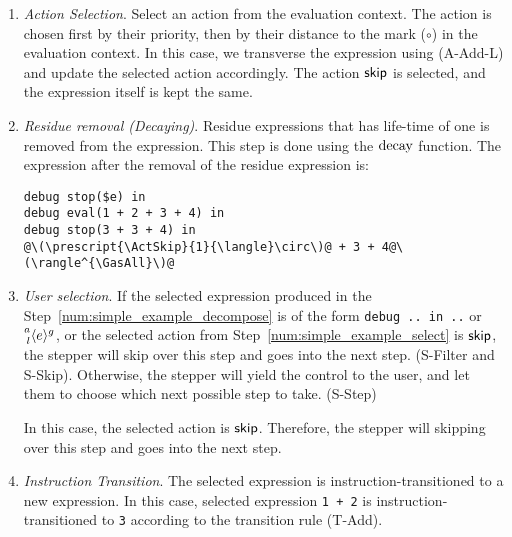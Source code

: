 \begin{enumerate}
  \begin{lstlisting}[language=hazel,caption={Decomposed evaluation context},label={lst:simple_example_decompose}]
debug stop($e) in
debug eval(1 + 2 + 3 + 4) in
debug stop(3 + 3 + 4) in
@\(
\prescript{\ActSkip}{1}{\langle}
\prescript{\ActStep}{0}{\langle}
\prescript{\ActStep}{0}{\langle}
\circ{\rangle}^{\GasOne}\)@ + 3@\({\rangle}^{\GasOne}\)@ + 4@\(
\rangle^{\GasAll}
\)@\end{lstlisting}

\item \emph{Action Selection}. \label{num:simple_example_select}
  Select an action from the evaluation context. The action is chosen
  first by their priority, then by their distance to the mark
  (\(\circ\)) in the evaluation context. In this case, we transverse
  the expression using (A-Add-L) and update the selected action
  accordingly. The action \(\ActSkip\) is selected, and the expression
  itself is kept the same.

\item \emph{Residue removal (Decaying)}. Residue expressions that
  has life-time of one is removed from the expression. This step is
  done using the \(\Decay\) function. The expression after the removal
  of the residue expression is:
  \begin{lstlisting}[language=hazel,caption={Evaluation context after decaying},label={lst:simple_example_decay}]
debug stop($e) in
debug eval(1 + 2 + 3 + 4) in
debug stop(3 + 3 + 4) in
@\(\prescript{\ActSkip}{1}{\langle}\circ\)@ + 3 + 4@\(\rangle^{\GasAll}\)@\end{lstlisting}

\item \emph{User selection}. If the selected expression produced in
  the Step~\ref{num:simple_example_decompose} is of the form
  \lstinline[language=hazel]{debug .. in ..} or
  \(\Residue{a}{g}{l}{e}\), or the selected action from
  Step~\ref{num:simple_example_select} is \(\ActSkip\), the stepper
  will skip over this step and goes into the next step. (S-Filter and
  S-Skip). Otherwise, the stepper will yield the control to the user,
  and let them to choose which next possible step to take. (S-Step)

  In this case, the selected action is \(\ActSkip\). Therefore, the stepper
  will skipping over this step and goes into the next step.

\item \emph{Instruction Transition}. The selected expression is
  instruction-transitioned to a new expression. In this case, selected
  expression \lstinline[language=hazel]{1 + 2} is
  instruction-transitioned to \lstinline[language=hazel]{3} according
  to the transition rule (T-Add).


\end{enumerate}

